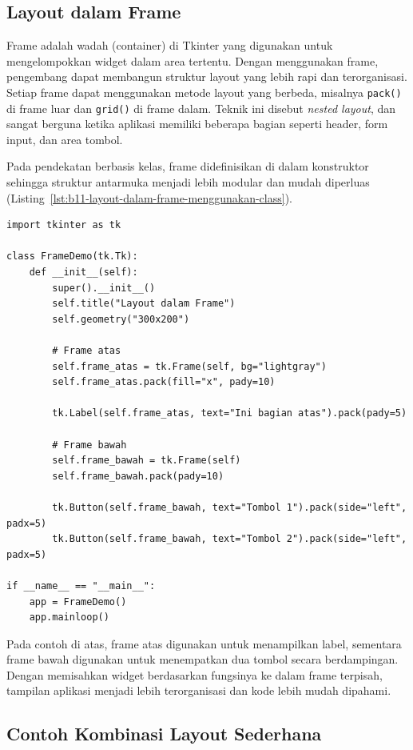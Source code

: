 \subsection{Layout dalam Frame}

Frame adalah wadah (container) di Tkinter yang digunakan untuk mengelompokkan widget dalam area tertentu. Dengan menggunakan frame, pengembang dapat membangun struktur layout yang lebih rapi dan terorganisasi. Setiap frame dapat menggunakan metode layout yang berbeda, misalnya \texttt{pack()} di frame luar dan \texttt{grid()} di frame dalam. Teknik ini disebut \textit{nested layout}, dan sangat berguna ketika aplikasi memiliki beberapa bagian seperti header, form input, dan area tombol.

Pada pendekatan berbasis kelas, frame didefinisikan di dalam konstruktor sehingga struktur antarmuka menjadi lebih modular dan mudah diperluas (Listing~\ref{lst:b11-layout-dalam-frame-menggunakan-class}).

\begin{lstlisting}[style=PythonStyle, caption={Contoh Layout dalam Frame Menggunakan Class}, label={lst:b11-layout-dalam-frame-menggunakan-class}]
import tkinter as tk

class FrameDemo(tk.Tk):
    def __init__(self):
        super().__init__()
        self.title("Layout dalam Frame")
        self.geometry("300x200")

        # Frame atas
        self.frame_atas = tk.Frame(self, bg="lightgray")
        self.frame_atas.pack(fill="x", pady=10)

        tk.Label(self.frame_atas, text="Ini bagian atas").pack(pady=5)

        # Frame bawah
        self.frame_bawah = tk.Frame(self)
        self.frame_bawah.pack(pady=10)

        tk.Button(self.frame_bawah, text="Tombol 1").pack(side="left", padx=5)
        tk.Button(self.frame_bawah, text="Tombol 2").pack(side="left", padx=5)

if __name__ == "__main__":
    app = FrameDemo()
    app.mainloop()
\end{lstlisting}

Pada contoh di atas, frame atas digunakan untuk menampilkan label, sementara frame bawah digunakan untuk menempatkan dua tombol secara berdampingan. Dengan memisahkan widget berdasarkan fungsinya ke dalam frame terpisah, tampilan aplikasi menjadi lebih terorganisasi dan kode lebih mudah dipahami.

\subsection{Contoh Kombinasi Layout Sederhana}

